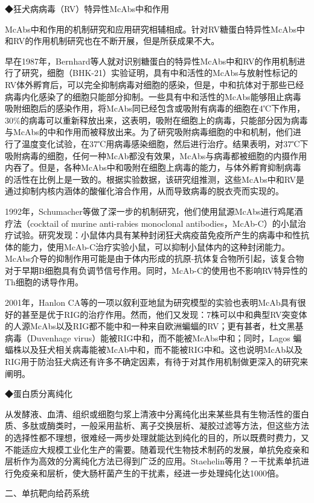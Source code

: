 ◆狂犬病病毒（RV）特异性McAbs中和作用

McAbs中和作用的机制研究和应用研究相辅相成。针对RV糖蛋白特异性McAbs中和RV的作用机制研究也在不断开展，但是所获成果不大。

早在1987年，Bernhard等人就对识别糖蛋白的特异性McAbs中和RV的作用机制进行了研究，细胞（BHK-21）实验证明，具有中和活性的McAbs与放射性标记的RV体外孵育后，可以完全抑制病毒对细胞的感染，但是，中和抗体对于那些已经病毒内化感染了的细胞只能部分抑制。一些具有中和活性的McAbs能够阻止病毒吸附细胞后的感染作用，将McAbs同已经包含或吸附有病毒的细胞在4℃下作用，30\%的病毒可以重新释放出来，这表明，吸附在细胞上的病毒，只能部分因为病毒与McAbs的中和作用而被释放出来。为了研究吸附病毒细胞的中和机制，他们进行了温度变化试验，在37℃用病毒感染细胞，然后进行治疗。结果表明，对37℃下吸附病毒的细胞，任何一种McAb都没有效果，McAbs与病毒都被细胞的内摄作用内吞了。但是，各种McAbs中和吸附在细胞上病毒的能力，与体外孵育抑制病毒的活性在比例上是一致的。根据实验数据，该研究组推测，这些McAbs中和RV是通过抑制内核内涵体的酸催化溶合作用，从而导致病毒的脱衣壳而实现的。

1992年，Schumacher等做了深一步的机制研究，他们使用鼠源McAbs进行鸡尾酒疗法（cocktail
of murine anti-rabies monoclonal
antibodies，McAb-C）的小鼠治疗试验。研究发现：小鼠体内具有某种封闭狂犬病疫苗免疫所产生的病毒中和性抗体的能力，使用McAb-C治疗实验小鼠，可以抑制小鼠体内的这种封闭能力。McAbs介导的抑制作用可能是由于体内形成的抗原-抗体复合物所引起，该复合物对于早期B细胞具有负调节信号作用。同时，McAb-C的使用也不影响RV特异性的Th细胞的诱导作用。

2001年，Hanlon
CA等的一项以叙利亚地鼠为研究模型的实验也表明McAb具有很好的甚至是优于RIG的治疗作用。然而，他们又发现：7株可以中和典型RV突变体的人源McAbs以及RIG都不能中和一种来自欧洲蝙蝠的RV；更有甚者，杜文黑基病毒（Duvenhage
virus）能被RIG中和，而不能被McAbs中和；同时，Lagos
蝙蝠株以及狂犬相关病毒能被McAb中和，而不能被RIG中和。这也说明McAb以及RIG用于防治狂犬病还有许多不确定因素，有待于对其作用机制做更深入的研究来阐明。

◆蛋白质分离纯化

从发酵液、血清、组织或细胞匀浆上清液中分离纯化出来某些具有生物活性的蛋白质、多肽或酶类时，一般采用盐析、离子交换层析、凝胶过滤等方法，但这些方法的选择性都不理想，很难经一两步处理就能达到纯化的目的，所以既费时费力，又不能适应大规模工业化生产的需要。随着现代生物技术制药的发展，单抗免疫亲和层析作为高效的分离纯化方法已得到广泛的应用。Staehelin等用？－干扰素单抗进行免疫亲和层析，使大肠杆菌产生的干扰素，经进一步处理纯化达1000倍。

\begin{center}
    {\large 二、单抗靶向给药系统}
    \end{center}


